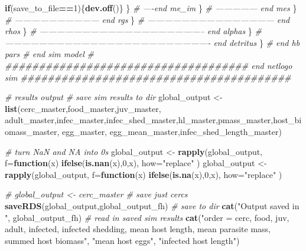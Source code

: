 \documentclass[10,portrait]{article}
\newenvironment{Shaded}{\begin{snugshade}}{\end{snugshade}}
\newcommand{\KeywordTok}[1]{\textcolor[rgb]{0.13,0.29,0.53}{\textbf{#1}}}
\newcommand{\DataTypeTok}[1]{\textcolor[rgb]{0.13,0.29,0.53}{#1}}
\newcommand{\DecValTok}[1]{\textcolor[rgb]{0.00,0.00,0.81}{#1}}
\newcommand{\StringTok}[1]{\textcolor[rgb]{0.31,0.60,0.02}{#1}}
\newcommand{\CommentTok}[1]{\textcolor[rgb]{0.56,0.35,0.01}{\textit{#1}}}
\newcommand{\ControlFlowTok}[1]{\textcolor[rgb]{0.13,0.29,0.53}{\textbf{#1}}}
\newcommand{\OperatorTok}[1]{\textcolor[rgb]{0.81,0.36,0.00}{\textbf{#1}}}
\newcommand{\NormalTok}[1]{#1}
\begin{document}
\begin{Shaded}
\begin{Highlighting}[]
{{{{{{{{{{{{                    \ControlFlowTok{if}\NormalTok{(save_to_file}\OperatorTok{==}\DecValTok{1}\NormalTok{)\{}\KeywordTok{dev.off}\NormalTok{()\}}
\NormalTok{                  \} }\CommentTok{# ----end me_im}
\NormalTok{                  \} }\CommentTok{# --------------- end mes}
\NormalTok{                \} }\CommentTok{# ------------------------------ end rgs}
\NormalTok{              \} }\CommentTok{# --------------------------------------------- end rhos}
\NormalTok{            \} }\CommentTok{# ----------------------------------------------------------- end alphas}
\NormalTok{          \} }\CommentTok{# ------------------------------------------------------------------------- end detritus}
\NormalTok{        \} }\CommentTok{# end hb pars # end sim model}
        \CommentTok{# ####################################  end netlogo sim ######################################## }
        
        \CommentTok{# results output }
        \CommentTok{# save sim results to dir }
\NormalTok{        global_output <-}\StringTok{ }\KeywordTok{list}\NormalTok{(cerc_master,food_master,juv_master, adult_master,infec_master,infec_shed_master,hl_master,pmass_master,host_biomass_master, egg_master, egg_mean_master,infec_shed_length_master) }
        
        \CommentTok{# turn NaN and NA into 0s}
\NormalTok{        global_output <-}\StringTok{ }\KeywordTok{rapply}\NormalTok{(global_output, }\DataTypeTok{f=}\ControlFlowTok{function}\NormalTok{(x) }\KeywordTok{ifelse}\NormalTok{(}\KeywordTok{is.nan}\NormalTok{(x),}\DecValTok{0}\NormalTok{,x), }\DataTypeTok{how=}\StringTok{"replace"}\NormalTok{ )}
\NormalTok{        global_output <-}\StringTok{ }\KeywordTok{rapply}\NormalTok{(global_output, }\DataTypeTok{f=}\ControlFlowTok{function}\NormalTok{(x) }\KeywordTok{ifelse}\NormalTok{(}\KeywordTok{is.na}\NormalTok{(x),}\DecValTok{0}\NormalTok{,x), }\DataTypeTok{how=}\StringTok{"replace"}\NormalTok{ )}
        
        \CommentTok{# global_output <- cerc_master # save just cercs}
        \KeywordTok{saveRDS}\NormalTok{(global_output,global_output_fh) }\CommentTok{# save to dir }
        \KeywordTok{cat}\NormalTok{(}\StringTok{"Output saved in "}\NormalTok{, global_output_fh)}
        \CommentTok{# read in saved sim results}
        \KeywordTok{cat}\NormalTok{(}\StringTok{"order = cerc, food, juv, adult, infected, infected shedding, mean host length, mean parasite mass, summed host biomass"}\NormalTok{, }\StringTok{"mean host eggs"}\NormalTok{, }\StringTok{"infected host length"}\NormalTok{)}
        
}}}}}}}}}}}}
\end{Highlighting}
\end{Shaded}
\end{document}
